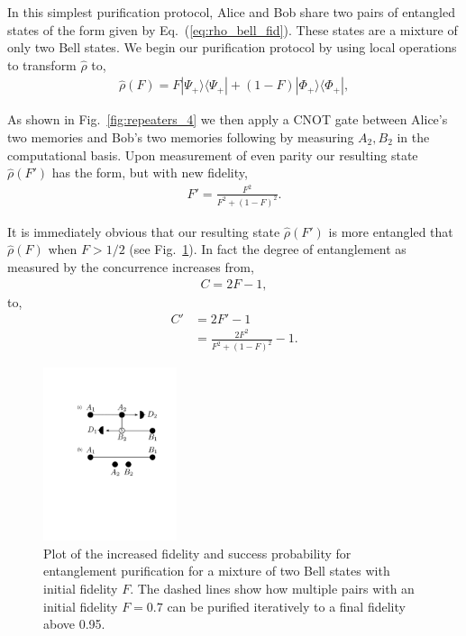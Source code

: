 \documentclass[twocolumn, aps, rmp, amsmath, amssymb, nofootinbib, superscriptaddress, longbibliography, floatfix, table-of-contents, eqsecnum]{revtex4-1}
\begin{document}
In this simplest purification protocol, Alice and Bob share two pairs of entangled states of the form given by Eq.~(\ref{eq:rho_bell_fid}). These states are a mixture of only two Bell states. We begin our purification protocol by using local operations to transform $\hat\rho$ to,
\begin{align}\label{eq:rho_bell_fid_dash}
\hat\rho(F)=F |\Psi_+\rangle \langle \Psi_+|+(1-F) |\Phi_+\rangle \langle \Phi_+|,
\end{align}

As shown in Fig.~\ref{fig:repeaters_4} we then apply a CNOT gate between Alice's two memories and Bob's two memories following by measuring $A_2,B_2$ in the computational basis. Upon measurement of even parity our resulting state $\hat\rho(F')$ has the form, but with new fidelity,
\begin{align}
	F'=\frac{F^2}{F^2+(1-F)^2}.
\end{align}

It is immediately obvious that our resulting state $\hat\rho(F')$ is more entangled that $\hat\rho(F)$ when \mbox{$F>1/2$} (see Fig.~\ref{fig:rep_purification}). In fact the degree of entanglement as measured by the concurrence increases from,
\begin{align}
	C=2 F-1,
\end{align}
to,
\begin{align}
C' &=2 F'-1 \nonumber\\
&= \frac{2 F^2}{F^2+(1-F)^2}-1.
\end{align}

\begin{figure}[!htb]
\includegraphics[width=0.35\textwidth]{repeaters_5}
\caption{Plot of the increased fidelity and success probability for entanglement purification for a mixture of two Bell states with initial fidelity $F$. The dashed lines show how multiple pairs with an initial fidelity $F=0.7$ can be purified iteratively to a final fidelity above 0.95.} 
\label{fig:rep_purification}
\end{figure} 
\end{document}
